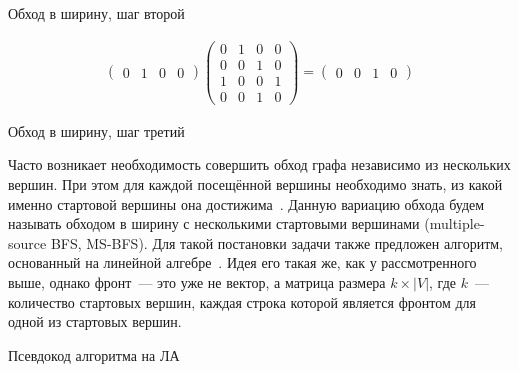 \begin{example}
\begin{marginfigure}
    \begin{center}
        \scalebox{0.8}{}
    \end{center}
    \caption{Обход в ширину, шаг второй}
    \label{fig:bfs_step_2}
\end{marginfigure}

\begin{align*}
    \begin{pmatrix}
        0 & 1 & 0 & 0
    \end{pmatrix}
    \begin{pmatrix}
        0 & 1 & 0 & 0 \\
        0 & 0 & 1 & 0 \\
        1 & 0 & 0 & 1 \\
        0 & 0 & 1 & 0
    \end{pmatrix} =
    \begin{pmatrix}
        0 & 0 & 1 & 0
    \end{pmatrix}
\end{align*}

\begin{marginfigure}
    \begin{center}
        \scalebox{0.8}{}
    \end{center}
    \caption{Обход в ширину, шаг третий}
    \label{fig:bfs_step_3}
\end{marginfigure}

\end{example}


Часто возникает необходимость совершить обход графа независимо из нескольких вершин.
При этом для каждой посещённой вершины необходимо знать, из какой именно стартовой вершины она достижима~.
Данную вариацию обхода будем называть обходом в ширину с несколькими стартовыми вершинами (multiple-source BFS, MS-BFS). 
Для такой постановки задачи также предложен алгоритм, основанный на линейной алгебре~.
Идея его такая же, как у рассмотренного выше, однако фронт~--- это уже не вектор, а матрица размера $k \times |V|$, где $k$~--- количество стартовых вершин, каждая строка которой является фронтом для одной из стартовых вершин.

Псевдокод алгоритма на ЛА

